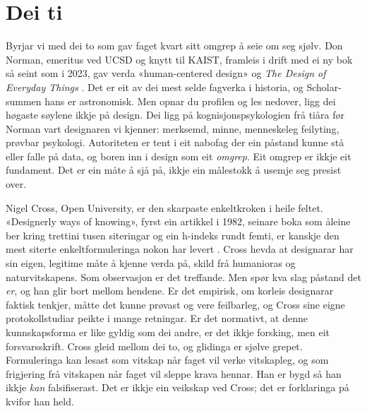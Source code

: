 \section{Dei ti}

Byrjar vi med dei to som gav faget kvart sitt omgrep å seie om seg sjølv. Don Norman, emeritus ved UCSD og knytt til KAIST, framleis i drift med ei ny bok så seint som i 2023, gav verda «human-centered design» og \textit{The Design of Everyday Things} \autocite{norman2013}. Det er eit av dei mest selde fagverka i historia, og Scholar-summen hans er astronomisk. Men opnar du profilen og les nedover, ligg dei høgaste søylene ikkje på design. Dei ligg på kognisjonspsykologien frå tiåra før Norman vart designaren vi kjenner: merksemd, minne, menneskeleg feilyting, prøvbar psykologi. Autoriteten er tent i eit nabofag der ein påstand kunne stå eller falle på data, og boren inn i design som eit \emph{omgrep}. Eit omgrep er ikkje eit fundament. Det er ein måte å sjå på, ikkje ein målestokk å usemje seg presist over.

Nigel Cross, Open University, er den skarpaste enkeltkroken i heile feltet. «Designerly ways of knowing», fyrst ein artikkel i 1982, seinare boka som åleine ber kring trettini tusen siteringar og ein h-indeks rundt femti, er kanskje den mest siterte enkeltformuleringa nokon har levert \autocite{cross1982,cross2006}. Cross hevda at designarar har sin eigen, legitime måte å kjenne verda på, skild frå humanioras og naturvitskapens. Som observasjon er det treffande. Men spør kva slag påstand det \emph{er}, og han glir bort mellom hendene. Er det empirisk, om korleis designarar faktisk tenkjer, måtte det kunne prøvast og vere feilbarleg, og Cross sine eigne protokollstudiar peikte i mange retningar. Er det normativt, at denne kunnskapsforma er like gyldig som dei andre, er det ikkje forsking, men eit forsvarsskrift. Cross gleid mellom dei to, og glidinga er sjølve grepet. Formuleringa kan lesast som vitskap når faget vil verke vitskapleg, og som frigjering frå vitskapen når faget vil sleppe krava hennar. Han er bygd så han ikkje \emph{kan} falsifiserast. Det er ikkje ein veikskap ved Cross; det er forklaringa på kvifor han held.

